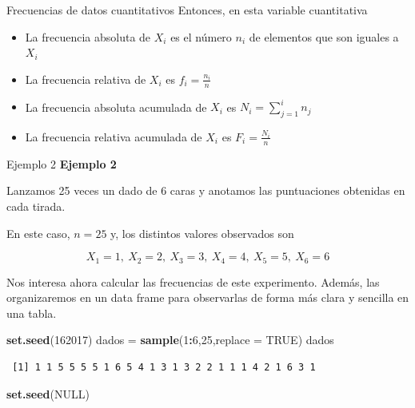 \documentclass[
  ignorenonframetext,
]{beamer}
\newenvironment{Shaded}{\begin{snugshade}}{\end{snugshade}}
\newcommand{\AttributeTok}[1]{\textcolor[rgb]{0.13,0.29,0.53}{#1}}
\newcommand{\ConstantTok}[1]{\textcolor[rgb]{0.56,0.35,0.01}{#1}}
\newcommand{\DecValTok}[1]{\textcolor[rgb]{0.00,0.00,0.81}{#1}}
\newcommand{\FunctionTok}[1]{\textcolor[rgb]{0.13,0.29,0.53}{\textbf{#1}}}
\newcommand{\NormalTok}[1]{#1}
\newcommand{\OtherTok}[1]{\textcolor[rgb]{0.56,0.35,0.01}{#1}}
\newcommand{\SpecialCharTok}[1]{\textcolor[rgb]{0.81,0.36,0.00}{\textbf{#1}}}
\providecommand{\tightlist}{%
  \setlength{\itemsep}{0pt}\setlength{\parskip}{0pt}}
\begin{document}
\begin{frame}{Frecuencias de datos cuantitativos}
\label{frecuencias-de-datos-cuantitativos-2}
Entonces, en esta variable cuantitativa

\begin{itemize}
\tightlist
\item
  La frecuencia absoluta de \(X_i\) es el número \(n_i\) de elementos
  que son iguales a \(X_i\)
\item
  La frecuencia relativa de \(X_i\) es \(f_i=\frac{n_i}{n}\)
\item
  La frecuencia absoluta acumulada de \(X_i\) es \(N_i=\sum_{j=1}^in_j\)
\item
  La frecuencia relativa acumulada de \(X_i\) es \(F_i=\frac{N_i}{n}\)
\end{itemize}
\end{frame}

\begin{frame}[fragile]{Ejemplo 2}
\label{ejemplo-2-4}
\textbf{Ejemplo 2}

Lanzamos 25 veces un dado de 6 caras y anotamos las puntuaciones
obtenidas en cada tirada.

En este caso, \(n=25\) y, los distintos valores observados son

\[X_1 = 1,\ X_2 = 2,\ X_3 = 3,\ X_4 = 4,\ X_5 = 5,\ X_6 = 6\]

Nos interesa ahora calcular las frecuencias de este experimento. Además,
las organizaremos en un data frame para observarlas de forma más clara y
sencilla en una tabla.

\begin{Shaded}
\begin{Highlighting}[]
\FunctionTok{set.seed}\NormalTok{(}\DecValTok{162017}\NormalTok{)}
\NormalTok{dados }\OtherTok{=} \FunctionTok{sample}\NormalTok{(}\DecValTok{1}\SpecialCharTok{:}\DecValTok{6}\NormalTok{,}\DecValTok{25}\NormalTok{,}\AttributeTok{replace =} \ConstantTok{TRUE}\NormalTok{)}
\NormalTok{dados}
\end{Highlighting}
\end{Shaded}

\begin{verbatim}
 [1] 1 1 5 5 5 5 1 6 5 4 1 3 1 3 2 2 1 1 1 4 2 1 6 3 1
\end{verbatim}

\begin{Shaded}
\begin{Highlighting}[]
\FunctionTok{set.seed}\NormalTok{(}\ConstantTok{NULL}\NormalTok{)}
\end{Highlighting}
\end{Shaded}
\end{frame}
\end{document}
